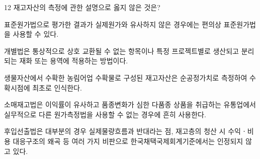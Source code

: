 \begin{question}{12}
재고자산의 측정에 관한 설명으로 옳지 않은 것은?
\begin{choices}
  \item 표준원가법으로 평가한 결과가 실제원가와 유사하지 않은 경우에는 편의상 표준원가법을 사용할 수 있다.
  \item 개별법은 통상적으로 상호 교환될 수 없는 항목이나 특정 프로젝트별로 생산되고 분리되는 재화 또는 용역에 적용하는 방법이다.
  \item 생물자산에서 수확한 농림어업 수확물로 구성된 재고자산은 순공정가치로 측정하여 수확시점에 최초로 인식한다.
  \item 소매재고법은 이익률이 유사하고 품종변화가 심한 다품종 상품을 취급하는 유통업에서 실무적으로 다른 원가측정법을 사용할 수 없는 경우에 흔히 사용한다.
  \item 후입선출법은 대부분의 경우 실제물량흐름과 반대라는 점, 재고층의 청산 시 수익ㆍ비용 대응구조의 왜곡 등 여러 가지 비판으로 한국채택국제회계기준에서는 인정되지 않고 있다.
\end{choices}
\end{question}
